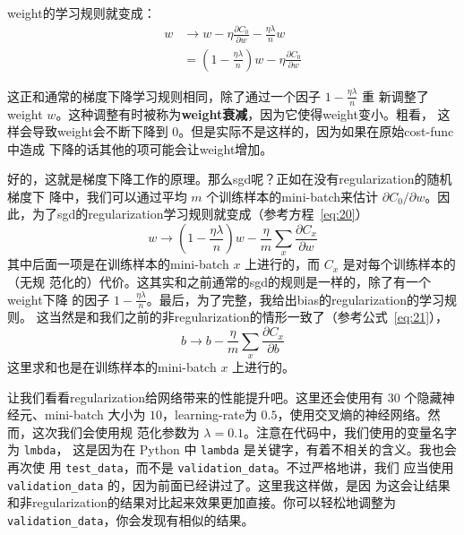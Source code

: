 \gls*{weight}的学习规则就变成：
\begin{align}
  w & \rightarrow w-\eta \frac{\partial C_0}{\partial
      w}-\frac{\eta \lambda}{n} w \label{eq:91}\tag{91}\\
    & = \left(1-\frac{\eta \lambda}{n}\right) w -\eta \frac{\partial
      C_0}{\partial w} \label{eq:92}\tag{92}
\end{align}

这正和通常的梯度下降学习规则相同，除了通过一个因子 $1-\frac{\eta\lambda}{n}$ 重
新调整了\gls*{weight} $w$。这种调整有时被称为\textbf{\gls*{weight}衰减}，因为它使得\gls*{weight}变小。粗看，
这样会导致\gls*{weight}会不断下降到 $0$。但是实际不是这样的，因为如果在原始\gls*{cost-func}中造成
下降的话其他的项可能会让\gls*{weight}增加。

好的，这就是梯度下降工作的原理。那么\gls*{sgd}呢？正如在没有\gls*{regularization}的随机梯度下
降中，我们可以通过平均 $m$ 个训练样本的\gls*{mini-batch}来估计 $\partial C_0/\partial
w$。因此，为了\gls*{sgd}的\gls*{regularization}学习规则就变成（参考方程~\eqref{eq:20}）
\begin{equation}
  w \rightarrow \left(1-\frac{\eta \lambda}{n}\right) w -\frac{\eta}{m}
  \sum_x \frac{\partial C_x}{\partial w}
  \label{eq:93}\tag{93}
\end{equation}
其中后面一项是在训练样本的\gls*{mini-batch} $x$ 上进行的，而 $C_x$ 是对每个训练样本的（无规
  范化的）代价。这其实和之前通常的\gls*{sgd}的规则是一样的，除了有一个\gls*{weight}下降
的因子 $1-\frac{\eta \lambda}{n}$。最后，为了完整，我给出\gls*{bias}的\gls*{regularization}的学习规则。
这当然是和我们之前的非\gls*{regularization}的情形一致了（参考公式~\eqref{eq:21}），
\begin{equation}
  b \rightarrow b - \frac{\eta}{m} \sum_x \frac{\partial C_x}{\partial b}
  \label{eq:94}\tag{94}
\end{equation}
这里求和也是在训练样本的\gls*{mini-batch} $x$ 上进行的。

让我们看看\gls*{regularization}给网络带来的性能提升吧。这里还会使用有 $30$ 个隐藏神经元、\gls*{mini-batch}
大小为 $10$，\gls*{learning-rate}为 $0.5$，使用交叉熵的神经网络。然而，这次我们会使用规
范化参数为 $\lambda = 0.1$。注意在代码中，我们使用的变量名字为 \lstinline!lmbda!，
这是因为在 Python 中 \lstinline!lambda! 是关键字，有着不相关的含义。我也会再次使
用 \lstinline!test_data!，而不是 \lstinline!validation_data!。不过严格地讲，我们
应当使用 \lstinline!validation_data! 的，因为前面已经讲过了。这里我这样做，是因
为这会让结果和非\gls*{regularization}的结果对比起来效果更加直接。你可以轻松地调整为
\lstinline!validation_data!，你会发现有相似的结果。


